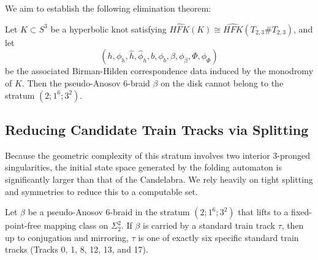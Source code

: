 We aim to establish the following elimination theorem:

\begin{theorem}\label{thm:two_triangle_stratum_classification}
    Let $K \subset S^3$ be a hyperbolic knot satisfying $\widehat{HFK}(K) \cong \widehat{HFK}(T_{2,3} \# T_{2,3})$, and let
    \[
    (h, \phi_h, \hat{h}, \hat{\phi}_h, b, \phi_b, \beta, \phi_\beta, \Phi, \phi_\Phi)
    \]
    be the associated Birman-Hilden correspondence data induced by the monodromy of $K$. Then the pseudo-Anosov 6-braid $\beta$ on the disk cannot belong to the stratum $(2;1^6;3^2)$.
\end{theorem}

\subsection{Reducing Candidate Train Tracks via Splitting}

Because the geometric complexity of this stratum involves two interior 3-pronged singularities, the initial state space generated by the folding automaton is significantly larger than that of the Candelabra. We rely heavily on tight splitting and symmetries to reduce this to a computable set.

\begin{lemma}\label{lem:two_triangle_reduction}
    Let $\beta$ be a pseudo-Anosov 6-braid in the stratum $(2;1^6;3^2)$ that lifts to a fixed-point-free mapping class on $\Sigma_2^2$. If $\beta$ is carried by a standard train track $\tau$, then up to conjugation and mirroring, $\tau$ is one of exactly six specific standard train tracks (Tracks 0, 1, 8, 12, 13, and 17).
\end{lemma}

